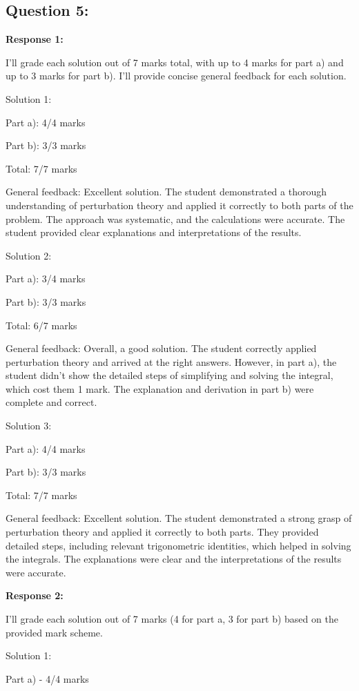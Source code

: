 \documentclass[a4paper,11pt]{article}
\begin{document}
\subsection*{Question 5:}

\textbf{Response 1:}

I'll grade each solution out of 7 marks total, with up to 4 marks for part a) and up to 3 marks for part b). I'll provide concise general feedback for each solution.

Solution 1:

Part a): 4/4 marks

Part b): 3/3 marks

Total: 7/7 marks

General feedback: Excellent solution. The student demonstrated a thorough understanding of perturbation theory and applied it correctly to both parts of the problem. The approach was systematic, and the calculations were accurate. The student provided clear explanations and interpretations of the results.

Solution 2:

Part a): 3/4 marks

Part b): 3/3 marks

Total: 6/7 marks

General feedback: Overall, a good solution. The student correctly applied perturbation theory and arrived at the right answers. However, in part a), the student didn't show the detailed steps of simplifying and solving the integral, which cost them 1 mark. The explanation and derivation in part b) were complete and correct.

Solution 3:

Part a): 4/4 marks

Part b): 3/3 marks

Total: 7/7 marks

General feedback: Excellent solution. The student demonstrated a strong grasp of perturbation theory and applied it correctly to both parts. They provided detailed steps, including relevant trigonometric identities, which helped in solving the integrals. The explanations were clear and the interpretations of the results were accurate.

\bigskip   
\textbf{Response 2:}

I'll grade each solution out of 7 marks (4 for part a, 3 for part b) based on the provided mark scheme.

Solution 1:

Part a) - 4/4 marks
\end{document}
